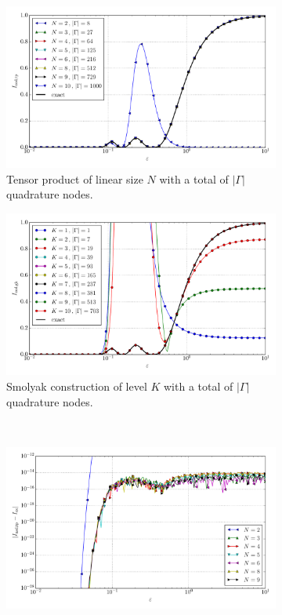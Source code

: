 \documentclass[a4paper,10pt]{article}
\begin{document}
\begin{figure}[ht!]
  \begin{subfigure}[t]{0.5\linewidth}
    \includegraphics[width=\linewidth]{./plots/tp_sg_3d_conv_eps_(2,2,2)_(2,2,2)_val_nsd_tp.pdf}
    \caption{Tensor product of linear size $N$ with a total of $|\Gamma|$ quadrature nodes.}
    \label{fig:tp_sg_3d_conv_eps_222_222_val_nsd_tp}
  \end{subfigure}
  \begin{subfigure}[t]{0.5\linewidth}
    \includegraphics[width=\linewidth]{./plots/tp_sg_3d_conv_eps_(2,2,2)_(2,2,2)_val_nsd_gk.pdf}
    \caption{Smolyak construction of level $K$ with a total of $|\Gamma|$ quadrature nodes.}
    \label{fig:tp_sg_3d_conv_eps_222_222_val_nsd_gk}
  \end{subfigure} \\
  \begin{subfigure}[t]{0.5\linewidth}
    \includegraphics[width=\linewidth]{./plots/tp_sg_3d_conv_eps_(2,2,2)_(2,2,2)_err_nsd_tp.pdf}

\end{subfigure}
\end{figure}
\end{document}
